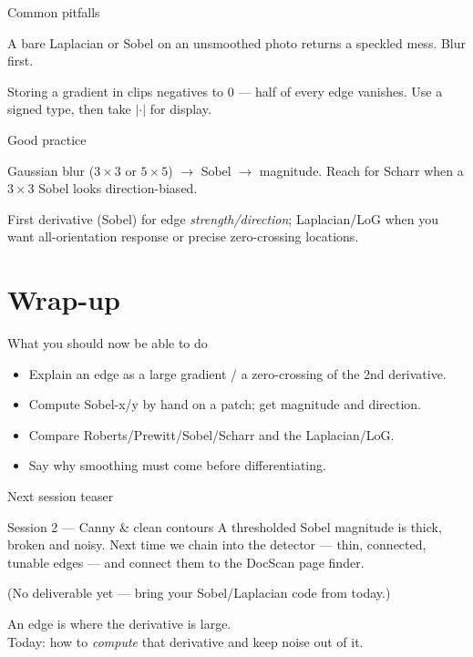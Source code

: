 \documentclass[10pt,aspectratio=169]{beamer}
\begin{document}
\begin{frame}{Common pitfalls}
  \begin{badbox}
    A bare Laplacian or Sobel on an unsmoothed photo returns a speckled mess. Blur first.
  \end{badbox}
  \begin{badbox}
    Storing a gradient in  clips negatives to 0 — half of every edge vanishes.
    Use a signed type, then take $|\cdot|$ for display.
  \end{badbox}
\end{frame}

\begin{frame}{Good practice}
  \begin{goodbox}
    Gaussian blur ($3{\times}3$ or $5{\times}5$) $\to$ Sobel  $\to$ magnitude.
    Reach for Scharr when a $3{\times}3$ Sobel looks direction-biased.
  \end{goodbox}
  \begin{goodbox}
    First derivative (Sobel) for edge \emph{strength/direction}; Laplacian/LoG when you want
    all-orientation response or precise zero-crossing locations.
  \end{goodbox}
\end{frame}

\section{Wrap-up}

\begin{frame}{What you should now be able to do}
  \begin{itemize}
    \item Explain an edge as a large gradient / a zero-crossing of the 2nd derivative.
    \item Compute Sobel-x/y by hand on a patch; get magnitude and direction.
    \item Compare Roberts/Prewitt/Sobel/Scharr and the Laplacian/LoG.
    \item Say why smoothing must come before differentiating.
  \end{itemize}
\end{frame}

\begin{frame}{Next session teaser}
  \begin{alertblock}{Session 2 — Canny \& clean contours}
    A thresholded Sobel magnitude is thick, broken and noisy. Next time we chain
     into the
     detector — thin, connected, tunable edges — and connect them to the
    DocScan page finder.
  \end{alertblock}
  \begin{center}\small (No deliverable yet — bring your Sobel/Laplacian code from today.)\end{center}
\end{frame}

\begin{frame}[standout]
  An edge is where the derivative is large.\\[4pt]
  \normalsize Today: how to \emph{compute} that derivative and keep noise out of it.
\end{frame}
\end{document}
